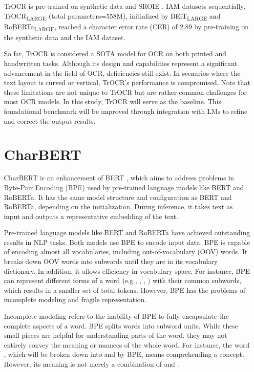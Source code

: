 TrOCR is pre-trained on synthetic data and SROIE \citep{huang2019icdar2019}, IAM datasets sequentially. TrOCR\textsubscript{LARGE} (total parameters=558M), initialized by BEiT\textsubscript{LARGE} and RoBERTa\textsubscript{LARGE}, reached a character error rate (CER) \citep{klakow2002testing}\citep{wang2003word} of 2.89 by pre-training on the synthetic data and the IAM dataset.

So far, TrOCR is considered a SOTA model for OCR on both printed and handwritten tasks. Although its design and capabilities represent a significant advancement in the field of OCR, deficiencies still exist. In scenarios where the text layout is curved or vertical, TrOCR's performance is compromised. Note that these limitations are not unique to TrOCR but are rather common challenges for most OCR models. In this study, TrOCR will serve as the baseline. This foundational benchmark will be improved through integration with LMs to refine and correct the output results.

\section{CharBERT}
\label{sec:2_charbert}
CharBERT \citep{ma2020charbert} is an enhancement of BERT \citep{devlin2018bert}, which aims to address problems in Byte-Pair Encoding (BPE) \citep{sennrich2015neural} used by pre-trained language models like BERT and RoBERTa. It has the same model structure and configuration as BERT and RoBERTa, depending on the initialization. During inference, it takes text as input and outputs a representative embedding of the text.

Pre-trained language models like BERT and RoBERTa have achieved outstanding results in NLP tasks. Both models use BPE to encode input data. BPE is capable of encoding almost all vocabularies, including out-of-vocabulary (OOV) words. It breaks down OOV words into subwords until they are in its vocabulary dictionary. In addition, it allows efficiency in vocabulary space. For instance, BPE can represent different forms of a word (e.g., , , ) with their common subwords, which results in a smaller set of total tokens. However, BPE has the problems of incomplete modeling and fragile representation.

Incomplete modeling refers to the inability of BPE to fully encapsulate the complete aspects of a word. BPE splits words into subword units. While these small pieces are helpful for understanding parts of the word, they may not entirely convey the meaning or nuances of the whole word. For instance, the word , which will be broken down into  and  by BPE, means comprehending a concept. However, its meaning is not merely a combination of  and .

